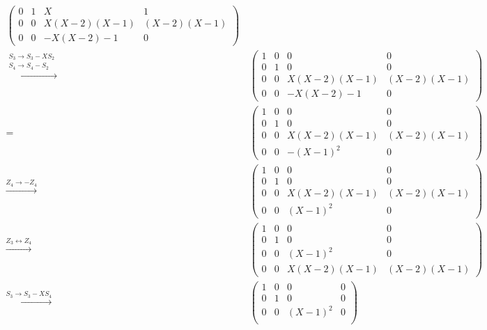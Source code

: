 \begin{align*}
\begin{pmatrix}
      0 & 1 &           X &          1  \\
      0 & 0 & X(X-2)(X-1) & (X-2)(X-1)  \\
      0 & 0 &   -X(X-2)-1 &          0
    \end{pmatrix}
  \\
  \xrightarrow{\substack{S_3 \to S_3 - X S_2 \\ S_4 \to S_4 - S_2}}&\,
    \begin{pmatrix}
      1 & 0 &           0 &          0  \\
      0 & 1 &           0 &          0  \\
      0 & 0 & X(X-2)(X-1) & (X-2)(X-1)  \\
      0 & 0 &   -X(X-2)-1 &          0
    \end{pmatrix}
  \\
  =&\,
    \begin{pmatrix}
      1 & 0 &           0 &          0  \\
      0 & 1 &           0 &          0  \\
      0 & 0 & X(X-2)(X-1) & (X-2)(X-1)  \\
      0 & 0 &    -(X-1)^2 &          0
    \end{pmatrix}
  \\
  \xrightarrow{Z_4 \to -Z_4}&\,
    \begin{pmatrix}
      1 & 0 &           0 &          0  \\
      0 & 1 &           0 &          0  \\
      0 & 0 & X(X-2)(X-1) & (X-2)(X-1)  \\
      0 & 0 &     (X-1)^2 &          0
    \end{pmatrix}
  \\
  \xrightarrow{Z_3 \leftrightarrow Z_4}&\,
    \begin{pmatrix}
      1 & 0 &           0 &          0  \\
      0 & 1 &           0 &          0  \\
      0 & 0 &     (X-1)^2 &          0  \\
      0 & 0 & X(X-2)(X-1) & (X-2)(X-1)
    \end{pmatrix}
  \\
  \xrightarrow{S_3 \to S_3 - X S_4}&\,
    \begin{pmatrix}
      1 & 0 &       0 &          0  \\
      0 & 1 &       0 &          0  \\
      0 & 0 & (X-1)^2 &          0  \\

\end{pmatrix}
\end{align*}
